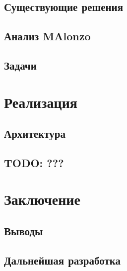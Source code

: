 \subsection{Существующие решения}

\subsection{Анализ MAlonzo}

\subsection{Задачи}

\newpage
\section{Реализация}

\subsection{Архитектура}

\subsection{TODO: ???}

\newpage
\section{Заключение}

\subsection{Выводы}

\subsection{Дальнейшая разработка}
